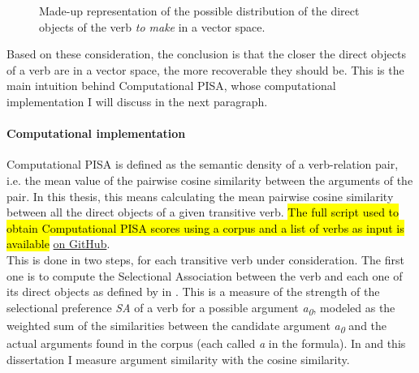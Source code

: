 \begin{figure}[htb]
\caption{Made-up representation of the possible distribution of the direct objects of the verb \textit{to make} in a vector space.}
\centering
{}
\end{figure}

Based on these consideration, the conclusion is that the closer the direct objects of a verb are in a vector space, the more recoverable they should be. This is the main intuition behind Computational PISA, whose computational implementation I will discuss in the next paragraph.

\paragraph{Computational implementation} Computational PISA is defined as the semantic density of a verb-relation pair, i.e. the mean value of the pairwise cosine similarity between the arguments of the pair. In this thesis, this means calculating the mean pairwise cosine similarity between all the direct objects of a given transitive verb. \hl{The full script used to obtain Computational PISA scores using a corpus and a list of verbs as input is available} \href{https://github.com/ellepannitto/PISA}{on GitHub}. \\
This is done in two steps, for each transitive verb under consideration. The first one is to compute the Selectional Association between the verb and each one of its direct objects as defined by \textcite{Erk2007, ErkEtAl2010} in . This is a measure of the strength of the selectional preference \textit{SA} of a verb for a possible argument \textit{a\textsubscript{0}}, modeled as the weighted sum of the similarities between the candidate argument \textit{a\textsubscript{0}} and the actual arguments found in the corpus (each called \textit{a} in the formula). In \textcite{CappelliLenciPISA} and this dissertation I measure argument similarity with the cosine similarity.

